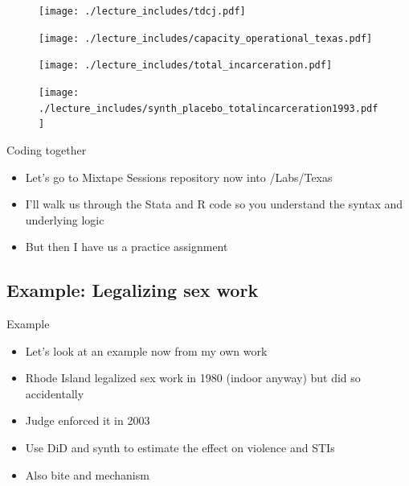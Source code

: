 \documentclass{beamer}
\begin{document}
\begin{frame}[shrink=30,plain]

\begin{figure}
\texttt{[image: ./lecture\_includes/tdcj.pdf]}
\end{figure}
\end{frame}


\begin{frame}[shrink=30,plain]
\begin{figure}
\texttt{[image: ./lecture\_includes/capacity\_operational\_texas.pdf]}
\end{figure}
\end{frame}



\begin{frame}[shrink=30,plain]

\begin{figure}
\texttt{[image: ./lecture\_includes/total\_incarceration.pdf]}
\end{figure}
\end{frame}

\begin{frame}[shrink=30,plain]

\begin{figure}
\texttt{[image: ./lecture\_includes/synth\_placebo\_totalincarceration1993.pdf]}
\end{figure}
\end{frame}





\begin{frame}{Coding together}

\begin{itemize}
\item Let's go to Mixtape Sessions repository now into /Labs/Texas 
\item I'll walk us through the Stata and R code so you understand the syntax and underlying logic
\item But then I have us a practice assignment 
\end{itemize}

\end{frame}


\subsection{Example: Legalizing sex work}

\begin{frame}{Example}

\begin{itemize}

\item Let's look at an example now from my own work
\item Rhode Island legalized sex work in 1980 (indoor anyway) but did so accidentally
\item Judge enforced it in 2003
\item Use DiD and synth to estimate the effect on violence and STIs
\item Also bite and mechanism
\end{itemize}

\end{frame}
\end{document}
